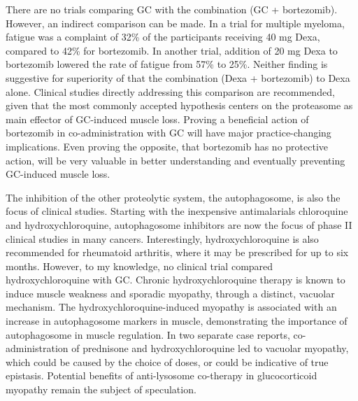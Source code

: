 \documentclass[12pt,english]{report}\usepackage[]{graphicx}\usepackage[]{color}
\begin{document}
There are no trials comparing GC with the combination (GC + bortezomib).
However, an indirect comparison can be made. In a trial for multiple
myeloma, fatigue was a complaint of 32\% of the participants receiving
40 mg Dexa, compared to 42\% for bortezomib\citep{richardson2007safety}.
In another trial, addition of 20 mg Dexa to bortezomib lowered the
rate of fatigue from 57\% to 25\%\citep{jagannath2006bortezomib}.
Neither finding is suggestive for superiority of that the combination
(Dexa + bortezomib) to Dexa alone. Clinical studies directly addressing
this comparison are recommended, given that the most commonly accepted
hypothesis centers on the proteasome as main effector of GC-induced
muscle loss. Proving a beneficial action of bortezomib in co-administration
with GC will have major practice-changing implications. Even proving
the opposite, that bortezomib has no protective action, will be very
valuable in better understanding and eventually preventing GC-induced
muscle loss.

The inhibition of the other proteolytic system, the autophagosome,
is also the focus of clinical studies. Starting with the inexpensive
antimalarials chloroquine and hydroxychloroquine, autophagosome inhibitors
are now the focus of phase II clinical studies in many cancers\citep{amaravadi2011principles}.
Interestingly, hydroxychloroquine is also recommended for rheumatoid
arthritis, where it may be prescribed for up to six months\citep{sanofiaventisusllc2006plaquenil}.
However, to my knowledge, no clinical trial compared hydroxychloroquine
with GC. Chronic hydroxychloroquine therapy is known to induce muscle
weakness and sporadic myopathy, through a distinct, vacuolar mechanism.
The hydroxychloroquine-induced myopathy is associated with an increase
in autophagosome markers in muscle, demonstrating the importance of
autophagosome in muscle regulation\citep{lee2012clinical}. In two
separate case reports, co-administration of prednisone and hydroxychloroquine
led to vacuolar myopathy, which could be caused by the choice of doses,
or could be indicative of true epistasis\citep{ghosh2013teaching,nucci1996chloroquine}.
Potential benefits of anti-lysosome co-therapy in glucocorticoid myopathy
remain the subject of speculation.
\end{document}
